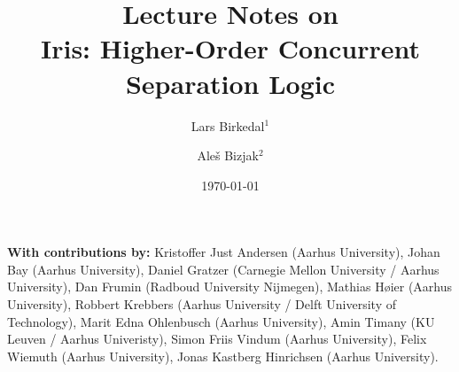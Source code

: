 \documentclass{article}
\title{\vfill Lecture Notes on\\ Iris: Higher-Order Concurrent Separation Logic}
\author{Lars Birkedal$^1$}
\author{Ale\v{s} Bizjak$^2$}
\affil{
  $^1$ \href{mailto:birkedal@cs.au.dk}{birkedal@cs.au.dk}\\
  $^2$ \href{ales@alesb.com}{ales@alesb.com}\\
  \vspace{2.5mm}
  Aarhus University}
\date{\today\vfill}
\begin{document}
\maketitle
\thispagestyle{empty}

\begin{minipage}{\textwidth-2cm}
  \textbf{With contributions by:}
  Kristoffer Just Andersen (Aarhus University),
  Johan Bay (Aarhus University),
  Daniel Gratzer (Carnegie Mellon University / Aarhus University),
  Dan Frumin (Radboud University Nijmegen),
  Mathias H{\o}ier (Aarhus University),
  Robbert Krebbers (Aarhus University / Delft University of Technology),
  Marit Edna Ohlenbusch (Aarhus University),
  Amin Timany (KU Leuven / Aarhus Univeristy),
  Simon Friis Vindum (Aarhus University),
  Felix Wiemuth (Aarhus University),
  Jonas Kastberg Hinrichsen (Aarhus University).
\end{minipage}

\newpage

\pagestyle{empty}
\setcounter{tocdepth}{2}
\tableofcontents

\newpage

\pagestyle{plain}
\setcounter{page}{1}


\newpage








































\appendix


\end{document}
